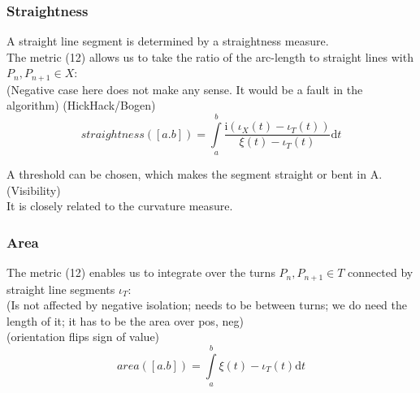 \documentclass{article}
\begin{document}
\subsubsection{Straightness}
A straight line segment is determined by a straightness measure.\\
The metric (12) allows us to take the ratio of the arc-length to straight lines with $P_{n},P_{n+1} \in X$:\\
(Negative case here does not make any sense. It would be a fault in the algorithm)
(HickHack/Bogen)
\begin{equation}
straightness([a.b])=\int \limits _{a}^{b} \frac{\mathrm{i} (\iota_{X}(t) - \iota_{T}(t))}{\xi(t) - \iota_{T}(t)} \mathrm{d}t
\end{equation}
\iffalse
\subsubsection{Algorithm Version}
It is using Heron's formula for the area of a triangle:
\begin{align*}
A=\lvert t_{m+1}-t_{m} \rvert\\
B=\lvert t_{m+2} - t_{m+1} \rvert\\
C=\lvert t_{m+2} - t_{m} \rvert\\
S=\frac{A+B+C}{2}
\end{align*}
to calculate the ratio of the areas in $A$ and lines in $B$:
\begin{align}
straightness([a,b])=\sum_{t=a}^{b-2}\frac{\sqrt{\xi(S)(\xi(S)-\xi(A))(\xi(S)-\xi(B))(\xi(S)-\xi(C))}}{\iota(A)+\iota(B)}
\end{align}
\fi
A threshold can be chosen, which makes the segment straight or bent in A. (Visibility)\\
It is closely related to the curvature measure.

\subsubsection{Area}
The metric (12) enables us to integrate over the turns $P_{n},P_{n+1} \in T$ connected by straight line segments $\iota_{T}$:\\
(Is not affected by negative isolation; needs to be between turns; we do need the length of it; it has to be the area over pos, neg)\\
(orientation flips sign of value)
\begin{equation}
area([a.b])=\int \limits _{a}^{b} \xi(t)-\iota_{T}(t) \mathrm{d}t
\end{equation}
\iffalse
\end{document}
